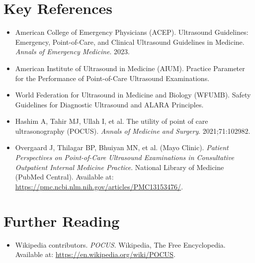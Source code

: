 \section{Key References}

\begin{itemize}
    \item American College of Emergency Physicians (ACEP). Ultrasound Guidelines: Emergency, Point-of-Care, and Clinical Ultrasound Guidelines in Medicine. \textit{Annals of Emergency Medicine}. 2023.
    \item American Institute of Ultrasound in Medicine (AIUM). Practice Parameter for the Performance of Point-of-Care Ultrasound Examinations.
    \item World Federation for Ultrasound in Medicine and Biology (WFUMB). Safety Guidelines for Diagnostic Ultrasound and ALARA Principles.
    \item Hashim A, Tahir MJ, Ullah I, et al. The utility of point of care ultrasonography (POCUS). \textit{Annals of Medicine and Surgery}. 2021;71:102982.
    \item Overgaard J, Thilagar BP, Bhuiyan MN, et al. (Mayo Clinic). \textit{Patient Perspectives on Point-of-Care Ultrasound Examinations in Consultative Outpatient Internal Medicine Practice}. National Library of Medicine (PubMed Central). Available at: \url{https://pmc.ncbi.nlm.nih.gov/articles/PMC13153476/}.
\end{itemize}

\section{Further Reading}
\begin{itemize}
  \item Wikipedia contributors. \textit{POCUS}. Wikipedia, The Free Encyclopedia. Available at: \url{https://en.wikipedia.org/wiki/POCUS}.
\end{itemize}
